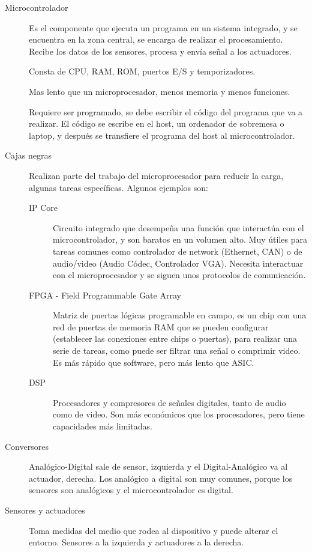 \documentclass[12pt]{report} %
\begin{document}
\begin{description}
	\item[Microcontrolador] Es el componente que ejecuta un programa en un sistema integrado, y se encuentra en la zona central, se encarga de realizar el procesamiento. Recibe los datos de los sensores, procesa y envía señal a los actuadores.
	
	Consta de CPU, RAM, ROM, puertos E/S y temporizadores.
	
	Mas lento que un microprocesador, menos memoria y menos funciones.
	
	Requiere ser programado, se debe escribir el código del programa que va a realizar. El código se escribe en el host, un ordenador de sobremesa o laptop, y después se transfiere el programa del host al microcontrolador.
	\item[Cajas negras] Realizan parte del trabajo del microprocesador para reducir la carga, algunas tareas específicas. Algunos ejemplos son:
	\begin{description}
		\item[IP Core] Circuito integrado que desempeña una función que interactúa con el microcontrolador, y son baratos en un volumen alto. Muy útiles para tareas comunes como controlador de network (Ethernet, CAN)  o de audio/video (Audio Códec, Controlador VGA). Necesita interactuar con el microprocesador y se siguen unos protocolos de comunicación. 

		\item[FPGA - Field Programmable Gate Array] Matriz de puertas lógicas programable en campo, es un chip con una red de puertas de memoria RAM que se pueden configurar (establecer las conexiones entre chips o puertas), para realizar una serie de tareas, como puede ser filtrar una señal o comprimir video. Es más rápido que software, pero más lento que ASIC. 

		\item[DSP] Procesadores y compresores de señales digitales, tanto de audio como de video. Son más económicos que los procesadores, pero tiene capacidades más limitadas.

	\end{description}
	\item[Conversores] Analógico-Digital sale de sensor, izquierda y el Digital-Analógico va al actuador, derecha. Los analógico a digital son muy comunes, porque los sensores son analógicos y el microcontrolador es digital.
	\item[Sensores y actuadores] Toma medidas del medio que rodea al dispositivo y puede alterar el entorno. Sensores a la izquierda y actuadores a la derecha.
\end{description}
\end{document}
